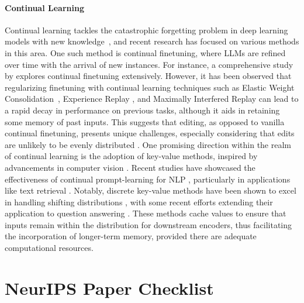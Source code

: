 \documentclass{article}
\begin{document}
\paragraph{Continual Learning}
Continual learning \cite{continual_survey1, continual_survey2} tackles the catastrophic forgetting problem in deep learning models with new knowledge~\cite{de2021continual}, and recent research has focused on various methods in this area. One such method is continual finetuning, where LLMs are refined over time with the arrival of new instances. For instance, a comprehensive study by \cite{lin2022continual} explores continual finetuning extensively. However, it has been observed that regularizing finetuning with continual learning techniques such as Elastic Weight Consolidation~\cite{ewc}, Experience Replay \cite{rolnick2019experience}, and Maximally Interfered Replay \cite{aljundi2019online} can lead to a rapid decay in performance on previous tasks, although it aids in retaining some memory of past inputs. 
This suggests that editing, as opposed to vanilla continual finetuning, presents unique challenges, especially considering that edits are unlikely to be evenly distributed \cite{henn2021principled}. 
One promising direction within the realm of continual learning is the adoption of key-value methods, inspired by advancements in computer vision \cite{liu2021post,van2017neural}. Recent studies have showcased the effectiveness of continual prompt-learning for NLP \cite{wang2022dualprompt,wang2022learning}, particularly in applications like text retrieval \cite{xiong2020approximate}. 
Notably, discrete key-value methods have been shown to excel in handling shifting distributions \cite{trauble2023discrete}, with some recent efforts extending their application to question answering \cite{dai2022lifelong}. 
These methods cache values to ensure that inputs remain within the distribution for downstream encoders, thus facilitating the incorporation of longer-term memory, provided there are adequate computational resources.

%
\newpage
\section*{NeurIPS Paper Checklist}

\end{document}

